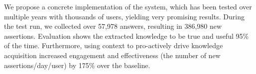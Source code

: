 We propose a concrete implementation of the system, which has been tested over multiple years with thousands of users, yielding very promising results. During the test run, we collected over 57,978 answers, resulting in 386,980 new assertions. Evaluation shows the extracted knowledge to be true and useful 95\% of the time. Furthermore, using context to pro-actively drive knowledge acquisition increased engagement and effectiveness (the number of new assertions/day/user) by 175\% over the baseline.